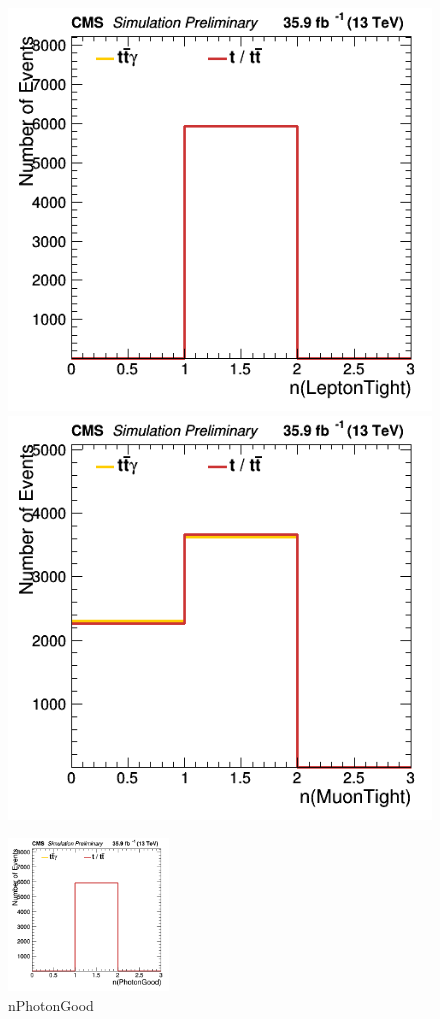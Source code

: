 \documentclass[11pt]{scrartcl}
\begin{document}
	\begin{figure}[H]
	\centering
	\begin{minipage}{.5\textwidth}
	  \centering
	  \includegraphics[width=0.75\linewidth]{figures/Notused/nLeptonTight.png}
	\end{minipage}%
	\begin{minipage}{.5\textwidth}
	  \centering
	  \includegraphics[width=0.75\linewidth]{figures/Notused/nMuonTight.png}
	\end{minipage}
	\end{figure}
	
	\begin{figure}[H]
		\begin{center}
		\includegraphics[width=0.38\textwidth]{figures/Notused/nPhotonGood.png}
		\caption{nPhotonGood}
		\end{center}
	\end{figure}
	
\end{document}
